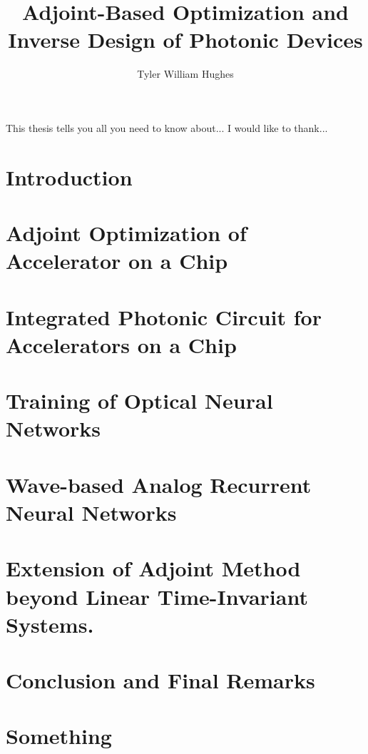 \documentclass{report}
\begin{document}
\title{Adjoint-Based Optimization and Inverse Design of Photonic Devices}
\author{Tyler William Hughes}
 
\beforepreface
{}
This thesis tells you all you need to know about...
I would like to thank...
\afterpreface


\chapter{Introduction}


\chapter{Adjoint Optimization of Accelerator on a Chip}


\chapter{Integrated Photonic Circuit for Accelerators on a Chip}


\chapter{Training of Optical Neural Networks}


\chapter{Wave-based Analog Recurrent Neural Networks}


\chapter{Extension of Adjoint Method beyond Linear Time-Invariant Systems.}


\chapter{Conclusion and Final Remarks}



\appendix
\chapter{Something}





\end{document}
